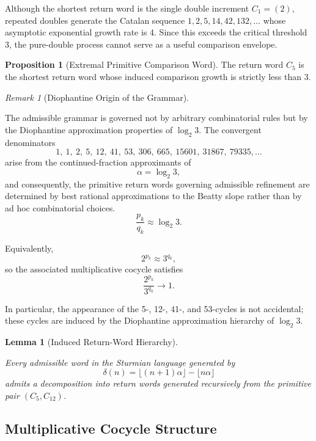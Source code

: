 \documentclass[12pt, oneside]{article}
\numberwithin{equation}{section}
\theoremstyle{definition}
\newtheorem{proposition}{Proposition}[section]
\theoremstyle{plain}
\newtheorem{lemma}[theorem]{Lemma}
\theoremstyle{remark}
\newtheorem*{remark}{Remark}
\begin{document}
Although the shortest return word is the single double increment $C_1=(2)$, repeated doubles generate the
Catalan sequence $1,2,5,14,42,132,\ldots$ whose asymptotic exponential growth rate is 4. Since this
exceeds the critical threshold 3, the pure-double process cannot serve as a useful comparison envelope.

\begin{proposition}[Extremal Primitive Comparison Word]
\label{prop:extremal-comparison-word}
The return word \(C_5\) is the shortest return word whose induced
comparison growth is strictly less than \(3\).
\end{proposition}

\begin{remark}[Diophantine Origin of the Grammar]
\label{rem:diophantine-grammar}

The admissible grammar is governed not by arbitrary combinatorial rules but by the Diophantine
approximation properties of \(\log_2 3\).  The convergent denominators
\[
1,\ 1,\ 2,\ 5,\ 12,\ 41,\ 53,\ 306,\ 665,\ 15601,\ 31867,\ 79335,\ldots
\]
arise from the continued-fraction approximants of
\[
\alpha=\log_2 3,
\]
and consequently, the primitive return words governing admissible refinement are
determined by best rational approximations to the Beatty slope rather than by
ad hoc combinatorial choices.
\[
\frac{p_k}{q_k}\approx \log_2 3.
\]

Equivalently,
\[
2^{p_k}\approx 3^{q_k},
\]
so the associated multiplicative cocycle satisfies
\[
\frac{2^{p_k}}{3^{q_k}}\to1.
\]

In particular, the appearance of the 5-, 12-, 41-, and 53-cycles
is not accidental; these cycles are induced by the Diophantine
approximation hierarchy of $\log_2 3$.
\end{remark}

\begin{lemma}[Induced Return-Word Hierarchy]
\label{lem:induced-hierarchy}

Every admissible word in the Sturmian language generated by
\[
\delta(n) = \lfloor (n+1)\alpha\rfloor-\lfloor n\alpha\rfloor
\]
admits a decomposition into return words generated
recursively from the primitive pair $(C_5, C_{12})$.
\end{lemma}

\noindent

\subsection{Multiplicative Cocycle Structure}
\end{document}
